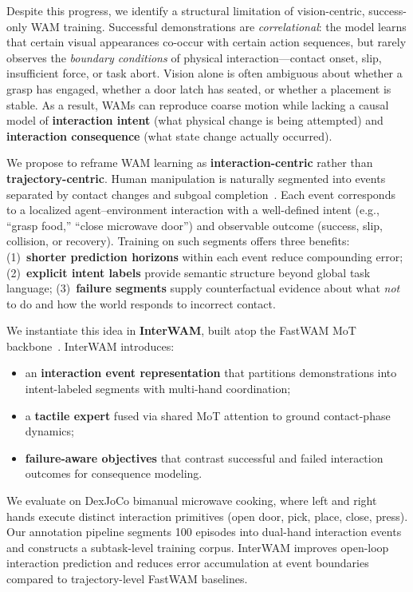 \documentclass{article}
\begin{document}
Despite this progress, we identify a structural limitation of vision-centric, success-only WAM training.
Successful demonstrations are \emph{correlational}: the model learns that certain visual appearances co-occur with certain action sequences, but rarely observes the \emph{boundary conditions} of physical interaction---contact onset, slip, insufficient force, or task abort.
Vision alone is often ambiguous about whether a grasp has engaged, whether a door latch has seated, or whether a placement is stable.
As a result, WAMs can reproduce coarse motion while lacking a causal model of \textbf{interaction intent} (what physical change is being attempted) and \textbf{interaction consequence} (what state change actually occurred).

We propose to reframe WAM learning as \textbf{interaction-centric} rather than \textbf{trajectory-centric}.
Human manipulation is naturally segmented into events separated by contact changes and subgoal completion~\citep{konidaris2018skills}.
Each event corresponds to a localized agent--environment interaction with a well-defined intent (e.g., ``grasp food,'' ``close microwave door'') and observable outcome (success, slip, collision, or recovery).
Training on such segments offers three benefits:
(1)~\textbf{shorter prediction horizons} within each event reduce compounding error;
(2)~\textbf{explicit intent labels} provide semantic structure beyond global task language;
(3)~\textbf{failure segments} supply counterfactual evidence about what \emph{not} to do and how the world responds to incorrect contact.

We instantiate this idea in \textbf{InterWAM}, built atop the FastWAM MoT backbone~\citep{fastwam2026}.
InterWAM introduces:
\begin{itemize}
    \item an \textbf{interaction event representation} that partitions demonstrations into intent-labeled segments with multi-hand coordination;
    \item a \textbf{tactile expert} fused via shared MoT attention to ground contact-phase dynamics;
    \item \textbf{failure-aware objectives} that contrast successful and failed interaction outcomes for consequence modeling.
\end{itemize}

We evaluate on DexJoCo bimanual microwave cooking, where left and right hands execute distinct interaction primitives (open door, pick, place, close, press).
Our annotation pipeline segments 100 episodes into dual-hand interaction events and constructs a subtask-level training corpus.
InterWAM improves open-loop interaction prediction and reduces error accumulation at event boundaries compared to trajectory-level FastWAM baselines.
\end{document}
